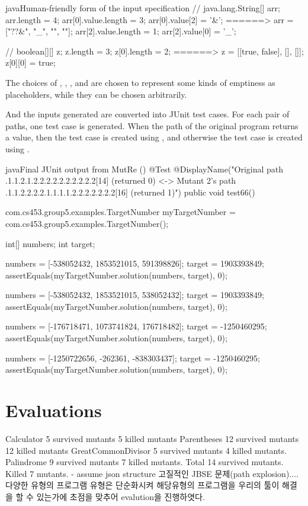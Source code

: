 \documentclass{article}
\begin{document}
\begin{listingsbox}{java}{Human-friendly form of the input specification}
// java.lang.String[] arr;
arr.length = 4;
arr[0].value.length = 3; arr[0].value[2] = '&';    ======>    arr = ["??&", "_", "", ""];
arr[2].value.length = 1; arr[2].value[0] = '_';

// boolean[][] z;
z.length = 3;     z[0].length = 2;                 ======>    z = [[true, false], [], []];
z[0][0] = true;
\end{listingsbox}
The choices of , \javainline{[]}, , and  are chosen to represent some kinds of emptiness as placeholders, while they can be chosen arbitrarily.

And the inputs generated are converted into JUnit test cases. For each pair of paths, one test case is generated. When the path of the original program returns a value, then the test case is created using , and otherwise the test case is created using .


\begin{listingsbox}{java}{Final JUnit output from MutRe ()}
@Test
@DisplayName("Original path .1.1.2.1.2.2.2.2.2.2.2.2.2.2[14] (returned 0) <-> Mutant 2's path
        .1.1.2.2.2.2.1.1.1.1.2.2.2.2.2.2.2[16] (returned 1)")
public void test66() {
    com.cs453.group5.examples.TargetNumber myTargetNumber = com.cs453.group5.examples.TargetNumber();
    
    int[] numbers;
    int target;
    
    numbers = [-538052432, 1853521015, 591398826];
    target = 1903393849;
    assertEquals(myTargetNumber.solution(numbers, target), 0);
    
    numbers = [-538052432, 1853521015, 538052432];
    target = 1903393849;
    assertEquals(myTargetNumber.solution(numbers, target), 0);
    
    numbers = [-176718471, 1073741824, 176718482];
    target = -1250460295;
    assertEquals(myTargetNumber.solution(numbers, target), 0);
    
    numbers = [-1250722656, -262361, -838303437];
    target = -1250460295;
    assertEquals(myTargetNumber.solution(numbers, target), 0);
}
\end{listingsbox}



\section{Evaluations}
\iffalse
Calculator 5 survived mutants 5 killed mutants
Parentheses 12 survived mutants 12 killed mutants
GreatCommonDivisor 5 survived mutants 4 killed mutants.
Palindrome 9 survived mutants 7 killed mutants.
Total 14 survived mutants. Killed 7 mutants.
- assume json structure
고질적인 JBSE 문제(path explosion).... 다양한 유형의 프로그램 유형은 단순화시켜 해당유형의 프로그램을 우리의 툴이 해결을 할 수 있는가에 초점을 맞추어 evalution을 진행하엿다.  
\end{document}
